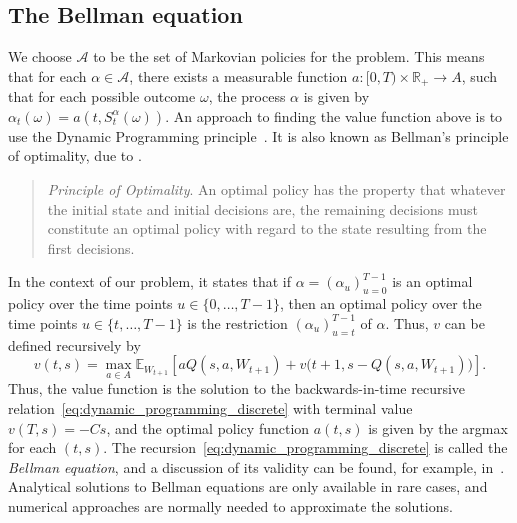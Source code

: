 \documentclass[main.tex]{subfiles}
\begin{document}
\subsection{The Bellman equation}\label{subsec:adp_bellman_equation}
We choose $\mathcal{A}$ to be the set of Markovian policies for the
problem. This means that for each $\alpha\in \mathcal{A}$, there exists a
measurable function $a:[0,T)\times \mathbb{R}_+\to A$, such that for each possible outcome
$\omega$, the process $\alpha$ is given by
$\alpha_t(\omega) = a(t,S_t^\alpha(\omega))$.
An approach to finding the value function above is to use the Dynamic
Programming principle~\citep{bertsekas2005dynamic}. It is also known
as Bellman's principle of optimality, due to \citet{bellman1954theory}.
\begin{quote}
  \emph{Principle of Optimality}. An optimal policy has the property that
  whatever the initial state and initial decisions are, the remaining decisions
  must constitute an optimal policy with regard to the state resulting
  from the first decisions.
\end{quote}
In the context of our problem, it states that
if $\alpha = {(\alpha_u)}_{u=0}^{T-1}$ is an optimal policy over the time
points $u\in\{0,\dots,T-1\}$, then an optimal policy
over the time points $u\in\{t,\dots,T-1\}$ is the restriction
${(\alpha_u)}_{u=t}^{T-1}$ of $\alpha$.
Thus, $v$ can be defined recursively by
\begin{equation}\label{eq:dynamic_programming_discrete}
  v(t,s)=\max_{a\in A}\mathbb{E}_{W_{t+1}}\left[
    aQ(s,a,W_{t+1})
    +v\bigl(t+1,s-Q(s,a,W_{t+1})\bigr)\right].
\end{equation}
Thus, the value function is the solution to the backwards-in-time
recursive relation~\eqref{eq:dynamic_programming_discrete} with
terminal value $v(T,s)=-Cs$, and the optimal policy
function $a(t,s)$ is given by the argmax for each $(t,s)$.
The recursion~\eqref{eq:dynamic_programming_discrete} is called the
\emph{Bellman equation}, and a discussion
of its validity can be found, for example, in~\citet{bertsekas2005dynamic}.
Analytical solutions to Bellman equations are only available in
rare cases, and  numerical approaches are normally needed to
approximate the solutions.
\end{document}
